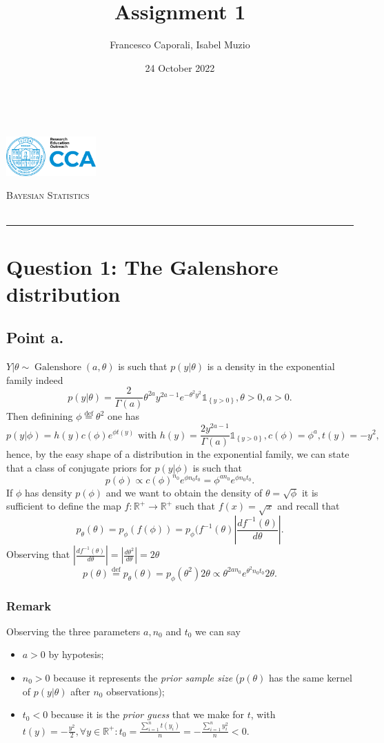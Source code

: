 \documentclass[
  11pt,
]{article}
\title{Assignment 1}
\author{Francesco Caporali, Isabel Muzio}
\date{24 October 2022}
\makeatletter
\providecommand{\tightlist}{%
  \setlength{\itemsep}{0pt}\setlength{\parskip}{0pt}}
\def\maketitle{%
            \pagestyle{plain}
            \begin{flushleft}
                \textsc{\small{%
                    \@author \\
                    \@date
                }}
            \end{flushleft}
            \begin{flushright}\vspace{-15mm}
            \includegraphics[height = 1.5cm]{./files/cca.png}
            \end{flushright}
            \begin{center}\vspace{-5mm}
                \scshape{\LARGE{\scshape{Bayesian Statistics}} \\
                \normalsize \@title} \\
                \rule{0.75\linewidth}{0.1mm}
            \end{center}
            }
\makeatother
\begin{document}
\maketitle

\hypertarget{question-1-the-galenshore-distribution}{%
\section{Question 1: The Galenshore
distribution}\label{question-1-the-galenshore-distribution}}

\hypertarget{point-a.}{%
\subsection{Point a.}\label{point-a.}}

\(Y | \theta \sim \operatorname{Galenshore}\left(a, \theta\right)\) is
such that \(p(y|\theta)\) is a density in the exponential family indeed
\[p(y | \theta) = \frac{2}{\Gamma(a)}\theta^{2a}y^{2a - 1}e^{-\theta^2y^2}\mathds{1}_{\left\{y > 0\right\}}, \theta > 0, a > 0.\]
Then definining \(\phi \stackrel{\text{def}}{=}\theta^2\) one has
\[p(y | \phi) = h(y)c(\phi)e^{\phi t(y)} \text{ with } h(y) =  \frac{2 y^{2a - 1}}{\Gamma(a)}\mathds{1}_{\left\{y > 0\right\}}, c(\phi) = \phi^a, t(y) = -y^2,\]
hence, by the easy shape of a distribution in the exponential family, we
can state that a class of conjugate priors for \(p(y | \phi)\) is such
that
\[p(\phi) \propto c(\phi)^{n_0}e^{\phi n_0t_0} = \phi^{a n_0}e^{\phi n_0t_0}.\]
If \(\phi\) has density \(p(\phi)\) and we want to obtain the density of
\(\theta = \sqrt{\phi}\) it is sufficient to define the map
\(f: \mathbb{R}^+ \to \mathbb{R}^+\) such that \(f(x) = \sqrt{x}\) and
recall that
\[p_{\theta}(\theta) = p_{\phi}(f(\phi)) = p_{\phi}(f^{-1}(\theta) \left|\frac{d f^{-1}(\theta)}{d \theta}\right|.\]
Observing that
\(\left|\frac{d f^{-1}(\theta)}{d \theta}\right| = \left|\frac{d \theta^2}{d \theta}\right| = 2\theta\)
\[p(\theta) \stackrel{\text{def}}{=}p_{\theta}(\theta) = p_{\phi}(\theta^2) 2 \theta \propto \theta^{2an_0} e^{\theta^2 n_0 t_0} 2 \theta.\]

\hypertarget{remark}{%
\subsubsection{Remark}\label{remark}}

Observing the three parameters \(a, n_0\) and \(t_0\) we can say

\begin{itemize}
\tightlist
\item
  \(a > 0\) by hypotesis;
\item
  \(n_0 > 0\) because it represents the \textit{prior sample size}
  (\(p(\theta)\) has the same kernel of \(p(y | \theta)\) after \(n_0\)
  observations);
\item
  \(t_0 < 0\) because it is the \textit{prior guess} that we make for
  \(t\), with
  \(t(y) = -\frac{y^2}{2}, \forall y \in \mathbb{R}^+: t_0 = \frac{\sum_{i = 1}^{n} t(y_i)}{n} = -\frac{\sum_{i = 1}^{n} y_i^2}{n} < 0\).
\end{itemize}
\end{document}
